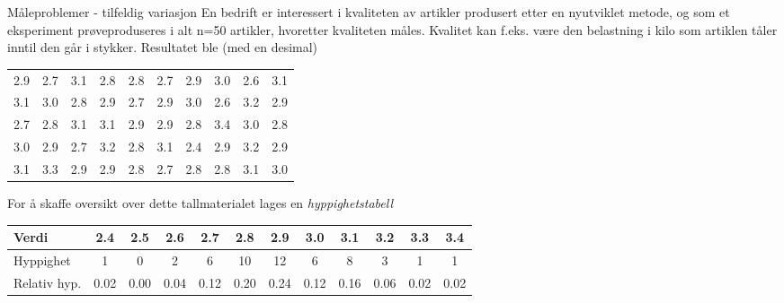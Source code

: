 \begin{eksempel}{Måleproblemer - tilfeldig variasjon}
En bedrift er interessert i kvaliteten av artikler produsert
etter en nyutviklet metode, og som et eksperiment prøveproduseres
i alt n=50 artikler, hvoretter kvaliteten måles.  Kvalitet kan
f.eks. være den belastning i kilo som artiklen tåler inntil den
går i stykker.  Resultatet ble (med en desimal)

 \begin{center} 
 \begin{tabular}{cccccccccc}
  2.9 & 2.7 & 3.1 & 2.8 & 2.8 & 2.7 & 2.9 & 3.0 & 2.6 & 3.1  \\
  3.1 & 3.0 & 2.8 & 2.9 & 2.7 & 2.9 & 3.0 & 2.6 & 3.2 & 2.9  \\
  2.7 & 2.8 & 3.1 & 3.1 & 2.9 & 2.9 & 2.8 & 3.4 & 3.0 & 2.8  \\
  3.0 & 2.9 & 2.7 & 3.2 & 2.8 & 3.1 & 2.4 & 2.9 & 3.2 & 2.9  \\
  3.1 & 3.3 & 2.9 & 2.9 & 2.8 & 2.7 & 2.8 & 2.8 & 3.1 & 3.0  \\
 \end{tabular}
\end{center}

\noindent For å skaffe oversikt over dette tallmaterialet lages en
{\em hyppighetstabell}

\begin{center}  \small \addtolength{\tabcolsep}{-0.4\tabcolsep}
 \begin{tabular}{l|ccccccccccc}
Verdi     & 2.4&2.5&2.6&2.7&2.8&2.9&3.0&3.1&3.2&3.3&3.4 \\ \hline
Hyppighet & 1 & 0 & 2 & 6 & 10 & 12 & 6 & 8& 3& 1 & 1 \\
Relativ hyp.&0.02&0.00&0.04&0.12&0.20&0.24&0.12&0.16&0.06&0.02&0.02 \\ \hline
 \end{tabular}
\end{center}
           

\end{eksempel}
